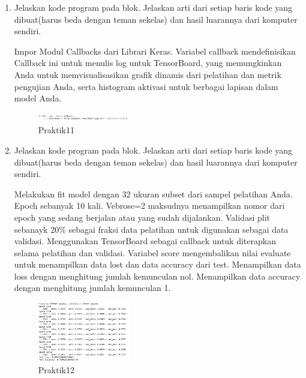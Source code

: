 \begin{enumerate}
\item Jelaskan kode program pada blok. Jelaskan arti dari setiap baris kode yang dibuat(harus beda dengan teman sekelas) dan hasil luarannya dari komputer sendiri.

Impor Modul Callbacks dari Librari Keras. Variabel callback mendefinisikan Callback ini untuk menulis log untuk TensorBoard, yang memungkinkan Anda untuk memvisualisasikan grafik dinamis dari pelatihan dan metrik pengujian Anda, serta histogram aktivasi untuk berbagai lapisan dalam model Anda.



	\begin{figure}[H]
		\includegraphics[width=4cm]{figures/1174008/7/praktik11.PNG}
            	\centering
           	 \caption{Praktik11}
       	 \end{figure}

\item Jelaskan kode program pada blok. Jelaskan arti dari setiap baris kode yang dibuat(harus beda dengan teman sekelas) dan hasil luarannya dari komputer sendiri.

Melakukan fit model dengan 32 ukuran subset dari sampel pelatihan Anda. Epoch sebanyak 10 kali. Vebrose=2 maksudnya menampilkan nomor dari epoch yang sedang berjalan atau yang sudah dijalankan. Validasi plit sebanayk 20\% sebagai fraksi data pelatihan untuk digunakan sebagai data validasi. Menggunakan TensorBoard sebagai callback untuk diterapkan selama pelatihan dan validasi. Variabel score mengembalikan nilai evaluate untuk menampilkan data lost dan data accuracy dari test. Menampilkan data loss dengan menghitung jumlah kemunculan nol. Menampilkan data accuracy dengan menghitung jumlah kemunculan 1.



	\begin{figure}[H]
		\includegraphics[width=4cm]{figures/1174008/7/praktik12.PNG}
            	\centering
           	 \caption{Praktik12}
       	 \end{figure}


\end{enumerate}
